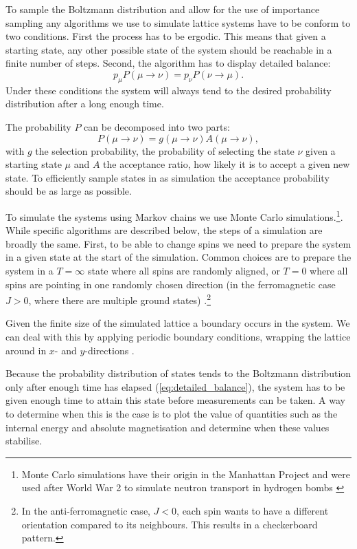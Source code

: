 \documentclass[11pt, a4paper]{report} %
\begin{document}
To sample the Boltzmann distribution and allow for the use of importance sampling any algorithms we use to simulate lattice systems have to be conform to two conditions.
First the process has to be ergodic.
This means that given a starting state, any other possible state of the system should be reachable in a finite number of steps.
Second, the algorithm has to display detailed balance:
\begin{equation}\label{eq:detailed_balance}
	p_{\mu} P(\mu \to \nu) = p_{\nu} P(\nu \to \mu).
\end{equation}
Under these conditions the system will always tend to the desired probability distribution after a long enough time.

The probability \(P\) can be decomposed into two parts:
\begin{equation}
	P(\mu\to\nu) = g(\mu\to\nu) A(\mu\to \nu),
\end{equation}
with \(g\) the selection probability, the probability of selecting the state \(\nu\) given a starting state \(\mu\) and \(A\) the acceptance ratio, how likely it is to accept a given new state.
To efficiently sample states in as simulation the acceptance probability should be as large as possible.

To simulate the systems using Markov chains we use Monte Carlo simulations.\footnote{Monte Carlo simulations have their origin in the Manhattan Project and were used after World War 2 to simulate neutron transport in hydrogen bombs \cite{newman:1999}}.
While specific algorithms are described below, the steps of a simulation are broadly the same.
First, to be able to change spins we need to prepare the system in a given state at the start of the simulation.
Common choices are to prepare the system in a \(T=\infty\) state where all spins are randomly aligned, or \(T=0\) where all spins are pointing in one randomly chosen direction (in the ferromagnetic case \(J>0\), where there are multiple ground states) \cite{newman:1999}.\footnote{In the anti-ferromagnetic case, \(J < 0\), each spin wants to have a different orientation compared to its neighbours. This results in a checkerboard pattern.}

Given the finite size of the simulated lattice a boundary occurs in the system.
We can deal with this by applying periodic boundary conditions, wrapping the lattice around in \(x\)- and \(y\)-directions \cite{landau:2015}.

Because the probability distribution of states tends to the Boltzmann distribution only after enough time has elapsed (\cref{eq:detailed_balance}), the system has to be given enough time to attain this state before measurements can be taken.
A way to determine when this is the case is to plot the value of quantities such as the internal energy and absolute magnetisation and determine when these values stabilise.
\end{document}
